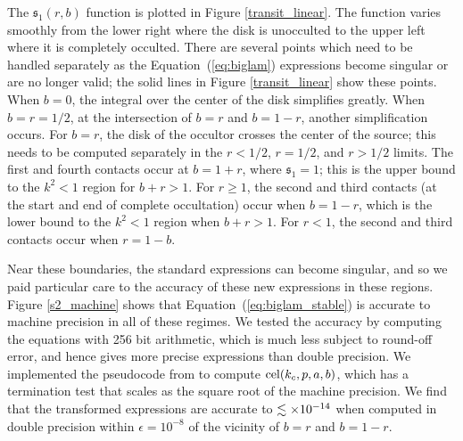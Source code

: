 \documentclass[modern]{aastex61}
\begin{document}
The $\mathfrak{s}_1(r,b)$ function is plotted in Figure \ref{transit_linear}.  The
function varies smoothly from the lower right where the disk is
unocculted to the upper left where it is completely occulted.
There are several points which need to be handled separately as
the Equation~(\ref{eq:biglam}) expressions become singular or are
no longer valid;  the solid lines in Figure \ref{transit_linear} show
these points.  When $b=0$, the integral over the center of the
disk simplifies greatly.  When $b=r=1/2$, at the intersection of
$b=r$ and $b=1-r$, another simplification occurs.  For $b=r$,
the disk of the occultor crosses the center of the source;
this needs to be computed separately in the $r<1/2$, $r=1/2$,
and $r>1/2$ limits.  The first and fourth contacts occur at
$b=1+r$, where $\mathfrak{s}_1=1$;  this is the upper bound to the $k^2 < 1$
region for $b+r >1$.
For $r \ge 1$, the second and third contacts (at the start and
end of complete occultation) occur when $b=1-r$, which is the
lower  bound to the $k^2<1$ region when $b+r >1$.
For $r < 1$, the second and third contacts occur when $r=1-b$.

Near these boundaries, the standard \citet{MandelAgol2002} expressions
can become singular, and so we paid particular care to the accuracy of these
new expressions in these regions.  Figure \ref{s2_machine} shows
that Equation~(\ref{eq:biglam_stable}) is accurate to machine
precision in all of these regimes.
We tested the accuracy by computing the equations with 256 bit
arithmetic, which is much less subject to round-off error, and
hence gives more precise expressions than double precision.  We implemented the
pseudocode from \citet{Bulirsch1969} to compute ${\rm cel}(k_c,p,a,b)$,
which has a termination test that scales as the square root of
the machine precision.  We find that the transformed expressions
are accurate to $\lesssim \times 10^{-14}$ when computed in double precision
within $\epsilon = 10^{-8}$ of the vicinity of $b=r$ and $b=1-r$.
\end{document}
